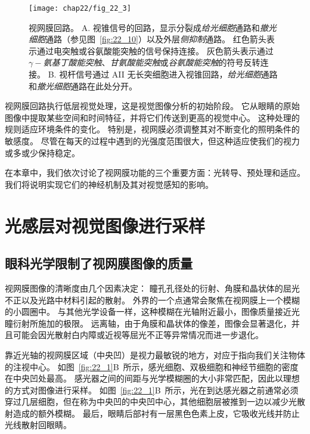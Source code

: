 \begin{figure}[htbp]
	\centering
	\texttt{[image: chap22/fig\_22\_3]}
	\caption{视网膜回路。
		A. 视锥信号的回路，显示分裂成\textit{给光细胞}通路和\textit{撤光细胞}通路（参见图~\ref{fig:22_10}）以及外层\textit{侧抑制}通路。
		红色箭头表示通过电突触或谷氨酸能突触的信号保持连接。
		灰色箭头表示通过\textit{$\gamma-$氨基丁酸能突触}、\textit{甘氨酸能突触}或\textit{谷氨酸能突触}的符号反转连接。
		B. 视杆信号通过 AII 无长突细胞进入视锥回路，\textit{给光细胞}通路和\textit{撤光细胞}通路在此处分开。}
	\label{fig:22_3}
\end{figure}


视网膜回路执行低层视觉处理，这是视觉图像分析的初始阶段。
它从眼睛的原始图像中提取某些空间和时间特征，并将它们传送到更高的视觉中心。
这种处理的规则适应环境条件的变化。
特别是，视网膜必须调整其对不断变化的照明条件的敏感度。
尽管在每天的过程中遇到的光强度范围很大，但这种适应使我们的视力或多或少保持稳定。


在本章中，我们依次讨论了视网膜功能的三个重要方面：光转导、预处理和适应。
我们将说明实现它们的神经机制及其对视觉感知的影响。



\section{光感层对视觉图像进行采样}

\subsection{眼科光学限制了视网膜图像的质量}

视网膜图像的清晰度由几个因素决定：
瞳孔孔径处的衍射、角膜和晶状体的屈光不正以及光路中材料引起的散射。
外界的一个点通常会聚焦在视网膜上一个模糊的小圆圈中。
与其他光学设备一样，这种模糊在光轴附近最小，图像质量接近光瞳衍射所施加的极限。
远离轴，由于角膜和晶状体的像差，图像会显著退化，并且可能会因光散射白内障或近视等屈光不正等异常情况而进一步退化。


靠近光轴的视网膜区域（中央凹）是视力最敏锐的地方，对应于指向我们关注物体的注视中心。
如图~\ref{fig:22_1}B~所示，感光细胞、双极细胞和神经节细胞的密度在中央凹处最高。
感光器之间的间距与光学模糊圈的大小非常匹配，因此以理想的方式对图像进行采样。
如图~\ref{fig:22_1}B~所示，光在到达感光器之前通常必须穿过几层细胞，但在称为中央凹的中央凹中心，其他细胞层被推到一边以减少光散射造成的额外模糊。
最后，眼睛后部衬有一层黑色色素上皮，它吸收光线并防止光线散射回眼睛。



